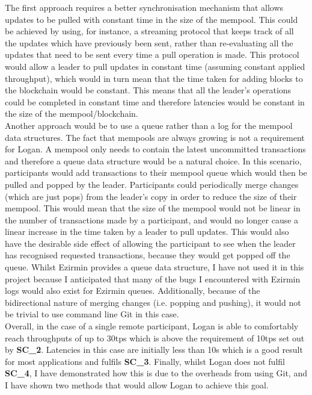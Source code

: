 \documentclass[12pt,a4paper,twoside,openright]{report}
\begin{document}
	The first approach requires a better synchronisation mechanism that allows updates to be pulled with constant time in the size of the mempool.
	This could be achieved by using, for instance, a streaming protocol that keeps track of all the updates which have previously been sent, rather than re-evaluating all the updates that need to be sent every time a pull operation is made. 
	This protocol would allow a leader to pull updates in constant time (assuming constant applied throughput), which would in turn mean that the time taken for adding blocks to the blockchain would be constant.
	This means that all the leader's operations could be completed in constant time and therefore latencies would be constant in the size of the mempool/blockchain. \\

	Another approach would be to use a queue rather than a log for the mempool data structures. 
	The fact that mempools are always growing is not a requirement for Logan.
	A mempool only needs to contain the latest uncommitted transactions and therefore a queue data structure would be a natural choice.
	In this scenario, participants would add transactions to their mempool queue which would then be pulled and popped by the leader.
	Participants could periodically merge changes (which are just pops) from the leader's copy in order to reduce the size of their mempool.
	This would mean that the size of the mempool would not be linear in the number of transactions made by a participant, and would no longer cause a linear increase in the time taken by a leader to pull updates.
	This would also have the desirable side effect of allowing the participant to see when the leader has recognised requested transactions, because they would get popped off the queue. 
	Whilst Ezirmin provides a queue data structure, I have not used it in this project because I anticipated that many of the bugs I encountered with Ezirmin logs would also exist for Ezirmin queues.
	Additionally, because of the bidirectional nature of merging changes (i.e. popping and pushing), it would not be trivial to use command line Git in this case. \\

	Overall, in the case of a single remote participant, Logan is able to comfortably reach throughputs of up to 30tps which is above the requirement of 10tps set out by \textbf{SC\_2}. 
	Latencies in this case are initially less than 10s which is a good result for most applications and fulfils \textbf{SC\_3}.
	Finally, whilst Logan does not fulfil \textbf{SC\_4}, I have demonstrated how this is due to the overheads from using Git, and I have shown two methods that would allow Logan to achieve this goal.
\end{document}
